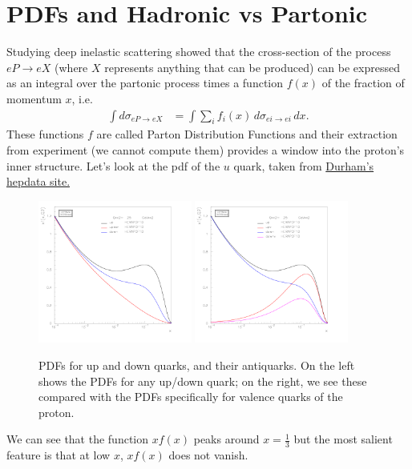 \documentclass[a4paper, 11pt, normalem]{report}
\begin{document}
\chapter{PDFs and Hadronic vs Partonic}
Studying deep inelastic scattering showed that the cross-section of the process $eP\to eX$ (where $X$ represents anything that can be produced) can be expressed as an integral over the partonic process times a function $f(x)$ of the fraction of momentum $x$, i.e.
\begin{align}
    \int d\sigma_{eP\to eX} &= \int \sum_i f_i(x)\,d\sigma_{ei\to ei}\,dx.
\end{align}
These functions $f$ are called Parton Distribution Functions and their extraction from experiment (we cannot compute them) provides a window into the proton's inner structure.
Let's look at the pdf of the $u$ quark, taken from \href{http://hepdata.cedar.ac.uk/pdf/pdf3.html}{Durham's hepdata site.}
\begin{figure}[H]
    \centering
    \includegraphics[width=0.45\textwidth]{pdf.png}
    \includegraphics[width=0.45\textwidth]{valence.png}
    \caption{PDFs for up and down quarks, and their antiquarks. On the left shows the PDFs for any up/down quark; on the right, we see these compared with the PDFs specifically for valence quarks of the proton.}
    \vspace{-20pt}
\end{figure}
We can see that the function $xf(x)$ peaks around $x=\frac13$ but the most salient feature is that at low $x$, $xf(x)$ does not vanish.
\end{document}
